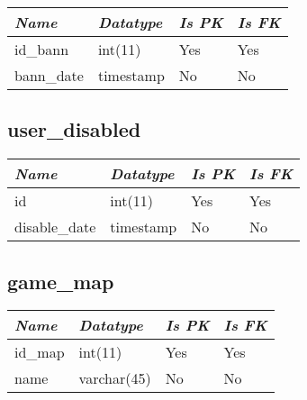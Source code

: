 \begin{table}[h!]
\centering
\small

    \begin{tabular}{ | m{} | m{} | m{} | m{} | }
    \hline
        \cellcolor{blue!25}\textbf{\textit{Name}} &

        \cellcolor{blue!25}\textbf{\textit{Datatype}} &
        \cellcolor{blue!25}\textbf{\textit{Is PK}} &
        \cellcolor{blue!25}\textbf{\textit{Is FK}} \\
    \hline
    \hline
        id\_bann & int(11) & Yes & Yes \\
    \hline
        bann\_date & timestamp & No & No \\
    \hline
    \end{tabular}

\end{table}

\subsection{user\_disabled}

\begin{table}[h!]
\centering
\small

    \begin{tabular}{ | m{} | m{} | m{} | m{} | }
    \hline
        \cellcolor{blue!25}\textbf{\textit{Name}} &

        \cellcolor{blue!25}\textbf{\textit{Datatype}} &
        \cellcolor{blue!25}\textbf{\textit{Is PK}} &
        \cellcolor{blue!25}\textbf{\textit{Is FK}} \\
    \hline
    \hline
        id & int(11) & Yes & Yes \\
    \hline
        disable\_date & timestamp & No & No \\
    \hline
    \end{tabular}

\end{table}

\subsection{game\_map}

\begin{table}[h!]
\centering
\small

    \begin{tabular}{ | m{} | m{} | m{} | m{} | }
    \hline
        \cellcolor{blue!25}\textbf{\textit{Name}} &

        \cellcolor{blue!25}\textbf{\textit{Datatype}} &
        \cellcolor{blue!25}\textbf{\textit{Is PK}} &
        \cellcolor{blue!25}\textbf{\textit{Is FK}} \\
    \hline
    \hline
        id\_map & int(11) & Yes & Yes \\
    \hline
        name & varchar(45) & No & No \\
    \hline
    \end{tabular}

\end{table}

